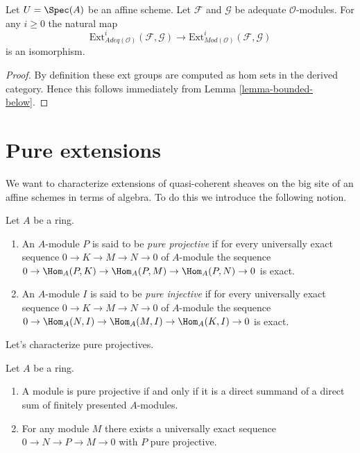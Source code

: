 \begin{lemma}
\label{lemma-ext-adequate}
Let $U = \Spec(A)$ be an affine scheme.
Let $\mathcal{F}$ and $\mathcal{G}$ be adequate $\mathcal{O}$-modules.
For any $i \geq 0$ the natural map
$$
\text{Ext}^i_{\textit{Adeq}(\mathcal{O})}(\mathcal{F}, \mathcal{G})
\longrightarrow
\text{Ext}^i_{\textit{Mod}(\mathcal{O})}(\mathcal{F}, \mathcal{G})
$$
is an isomorphism.
\end{lemma}

\begin{proof}
By definition these ext groups are computed as hom sets in the
derived category. Hence this follows immediately from
Lemma \ref{lemma-bounded-below}.
\end{proof}









\section{Pure extensions}
\label{section-pure}

\noindent
We want to characterize extensions of quasi-coherent sheaves on
the big site of an affine schemes in terms of algebra. To do this
we introduce the following notion.

\begin{definition}
\label{definition-pure}
Let $A$ be a ring.
\begin{enumerate}
\item An $A$-module $P$ is said to be {\it pure projective}
if for every universally exact sequence
$0 \to K \to M \to N \to 0$ of $A$-module the sequence
$0 \to \Hom_A(P, K) \to \Hom_A(P, M) \to \Hom_A(P, N) \to 0$
is exact.
\item An $A$-module $I$ is said to be {\it pure injective}
if for every universally exact sequence
$0 \to K \to M \to N \to 0$ of $A$-module the sequence
$0 \to \Hom_A(N, I) \to \Hom_A(M, I) \to \Hom_A(K, I) \to 0$
is exact.
\end{enumerate}
\end{definition}

\noindent
Let's characterize pure projectives.

\begin{lemma}
\label{lemma-pure-projective}
Let $A$ be a ring.
\begin{enumerate}
\item A module is pure projective if and only if
it is a direct summand of a direct sum of finitely presented $A$-modules.
\item For any module $M$ there exists a universally exact sequence
$0 \to N \to P \to M \to 0$ with $P$ pure projective.
\end{enumerate}
\end{lemma}

